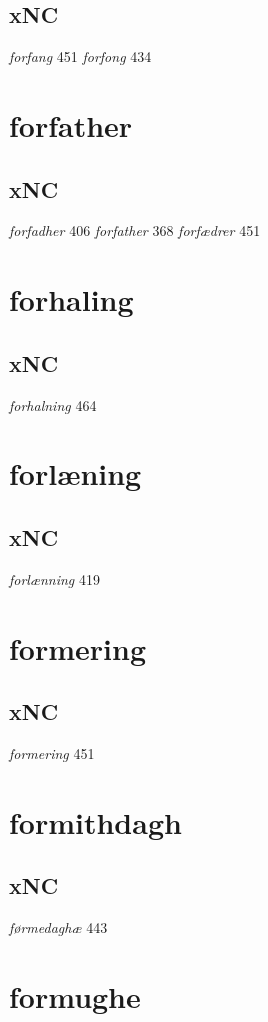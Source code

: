 \documentclass[a4paper,twocolumn]{article}
\begin{document}
\subsection{xNC}
\label{sec:org6656a86}
\emph{forfang} 451 \emph{forfong} 434 
\section{forfather}
\label{sec:orgf13c89c}
\subsection{xNC}
\label{sec:org55e127f}
\emph{forfadher} 406 \emph{forfather} 368 \emph{forfædrer} 451 
\section{forhaling}
\label{sec:org44af63c}
\subsection{xNC}
\label{sec:org81504c7}
\emph{forhalning} 464 
\section{forlæning}
\label{sec:orgf482f91}
\subsection{xNC}
\label{sec:org0572bc9}
\emph{forlænning} 419 
\section{formering}
\label{sec:org56fa3ef}
\subsection{xNC}
\label{sec:orgb6c9e8d}
\emph{formering} 451 
\section{formithdagh}
\label{sec:orgcdf2158}
\subsection{xNC}
\label{sec:org165a63a}
\emph{førmedaghæ} 443 
\section{formughe}
\label{sec:org14314b8}
\end{document}
